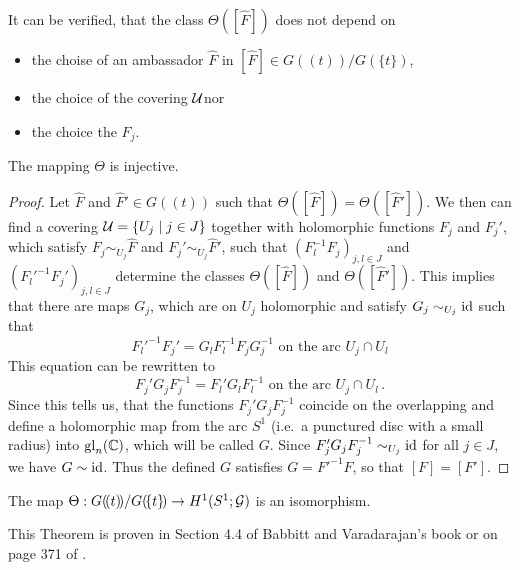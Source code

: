 It can be verified, that the class $\Theta([\hat F])$ does not depend on
\begin{itemize}
  \item the choise of an ambassador $\hat F$ in
    $[\hat F]\in G(\!(t)\!)/G(\!\{t\}\!)$\PROBLEM[proof!],
  \item the choice of the covering $\mathcal{U}$\PROBLEM[proof!] nor
  \item the choice the $F_j$\PROBLEM[proof!].
\end{itemize}
\begin{lem}
  The mapping $\Theta$ is injective.
\end{lem}
\begin{proof}
  Let $\hat F$ and $\hat F'\in G(\!(t)\!)$ such that
  $\Theta([\hat F])=\Theta([\hat F'])$.
  We then can find a covering $\mathcal{U}=\{U_j\mid j\in J\}$ together with
  holomorphic functions $F_j$ and $F_j'$, which satisfy
  $F_j\sim_{U_j}\hat F$ and $F_j'\sim_{U_j}\hat F'$, such that
  $(F_l^{-1}F_j)_{j,l\in J}$ and $(F_l'^{-1}F_j')_{j,l\in J}$ determine the
  classes $\Theta([\hat F])$ and $\Theta([\hat F'])$.
  This implies that there are maps $G_j$, which are on $U_j$ holomorphic and
  satisfy $G_j\sim_{U_j}\operatorname{id}$ such that
  \[
    F_l'^{-1}F_j'=G_lF_l^{-1}F_jG_j^{-1}
    \text{~on~the~arc~} U_j\cap U_l
  \]
  This equation can be rewritten to
  \[
    F_j'G_jF_j^{-1}=F_l'G_lF_l^{-1}
    \text{~on~the~arc~} U_j\cap U_l \,.
  \]
  Since this tells us, that the functions $F_j'G_jF_j^{-1}$ coincide on
  the overlapping and define a holomorphic map from the arc $S^1$ (i.e.\ a
  punctured disc with a small radius) into $\operatorname{gl}_n(\mathbb{C})$, which will be called
  $G$.
  Since $F_j'G_jF_j^{-1}\sim_{U_j}\operatorname{id}$ for all $j\in J$, we have
  $G\sim\operatorname{id}$.
  Thus the defined $G$ satisfies $G=F'^{-1}F$, so that $[F]=[F']$.
\end{proof}
\begin{thm}\label{thm:thm1helpMalgSibuy}
  The map $\Theta:G(\!(t)\!)/G(\!\{t\}\!)\to H^1(S^1;\mathcal{G})$ is an isomorphism.
\end{thm}
This Theorem is proven in Section 4.4 of Babbitt and Varadarajan's book
\cite{babbitt1989local} or on page 371 of \cite{Martinet1991}.

